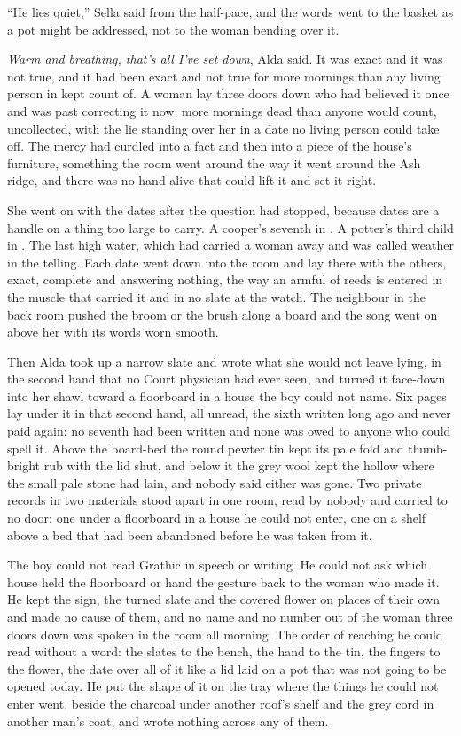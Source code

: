 “He lies quiet,” Sella said from the half-pace, and the words went to the basket as a pot might be addressed, not to the woman bending over it.

\emph{Warm and breathing, that's all I've set down}, Alda said. It was exact and it was not true, and it had been exact and not true for more mornings than any living person in  kept count of. A woman lay three doors down who had believed it once and was past correcting it now; more mornings dead than anyone would count, uncollected, with the lie standing over her in a date no living person could take off. The mercy had curdled into a fact and then into a piece of the house's furniture, something the room went around the way it went around the Ash ridge, and there was no hand alive that could lift it and set it right.

She went on with the dates after the question had stopped, because dates are a handle on a thing too large to carry. A cooper's seventh in . A potter's third child in . The last high water, which had carried a woman away and was called weather in the telling. Each date went down into the room and lay there with the others, exact, complete and answering nothing, the way an armful of reeds is entered in the muscle that carried it and in no slate at the watch. The neighbour in the back room pushed the broom or the brush along a board and the song went on above her with its words worn smooth.

Then Alda took up a narrow slate and wrote what she would not leave lying, in the second hand that no Court physician had ever seen, and turned it face-down into her shawl toward a floorboard in a house the boy could not name. Six pages lay under it in that second hand, all unread, the sixth written long ago and never paid again; no seventh had been written and none was owed to anyone who could spell it. Above the board-bed the round pewter tin kept its pale fold and thumb-bright rub with the lid shut, and below it the grey wool kept the hollow where the small pale stone had lain, and nobody said either was gone. Two private records in two materials stood apart in one room, read by nobody and carried to no door: one under a floorboard in a house he could not enter, one on a shelf above a bed that had been abandoned before he was taken from it.

The boy could not read Grathic in speech or writing. He could not ask which house held the floorboard or hand the gesture back to the woman who made it. He kept the sign, the turned slate and the covered flower on places of their own and made no cause of them, and no name and no number out of the woman three doors down was spoken in the room all morning. The order of reaching he could read without a word: the slates to the bench, the hand to the tin, the fingers to the flower, the date over all of it like a lid laid on a pot that was not going to be opened today. He put the shape of it on the tray where the things he could not enter went, beside the charcoal under another roof's shelf and the grey cord in another man's coat, and wrote nothing across any of them.

